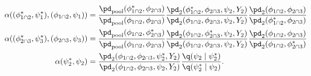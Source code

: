 \begin{align}
  \alpha((\phi_{1 \cap 2}^{*}, \psi_{1}^{*}), (\phi_{1 \cap 2}, \psi_{1})) &= 
    \frac {
      \pd_{\text{pool}}(\phi_{1 \cap 2}^{*}, \phi_{2 \cap 3})
    } {
      \pd_{\text{pool}}(\phi_{1 \cap 2}, \phi_{2 \cap 3})
    }
    \frac {
      \pd_{2}(\phi_{1 \cap 2}^{*}, \phi_{2 \cap 3}, \psi_{2}, Y_{2})
    } {
      \pd_{2}(\phi_{1 \cap 2}, \phi_{2 \cap 3}, \psi_{2}, Y_{2})
    }
    \frac {
      \pd_{2} (\phi_{1 \cap 2}, \phi_{2 \cap 3})
    } {
      \pd_{2} (\phi_{1 \cap 2}^{*}, \phi_{2 \cap 3})
    }
  \\
  \alpha((\phi_{2 \cap 3}^{*}, \psi_{3}^{*}), (\phi_{2 \cap 3}, \psi_{3})) &= 
    \frac {
      \pd_{\text{pool}}(\phi_{1 \cap 2}, \phi_{2 \cap 3}^{*})
    } {
      \pd_{\text{pool}}(\phi_{1 \cap 2}, \phi_{2 \cap 3})
    }
    \frac {
      \pd_{2}(\phi_{1 \cap 2}, \phi_{2 \cap 3}^{*}, \psi_{2}, Y_{2})
    } {
      \pd_{2}(\phi_{1 \cap 2}, \phi_{2 \cap 3}, \psi_{2}, Y_{2})
    }
    \frac {
      \pd_{2} (\phi_{1 \cap 2}, \phi_{2 \cap 3})
    } {
      \pd_{2} (\phi_{1 \cap 2}, \phi_{2 \cap 3}^{*})
    }
  \\
  \alpha(\psi_{2}^{*}, \psi_{2}) &=
    \frac {
      \pd_{2}(\phi_{1 \cap 2}, \phi_{2 \cap 3}, \psi_{2}^{*}, Y_{2})
    } {
      \pd_{2}(\phi_{1 \cap 2}, \phi_{2 \cap 3}, \psi_{2}, Y_{2})
    }
    \frac {
      \q(\psi_{2} \mid \psi_{2}^{*})
    } {
      \q(\psi_{2}^{*} \mid \psi_{2})
    }.
  \label{eqn:stage-two-acceptance}
\end{align}